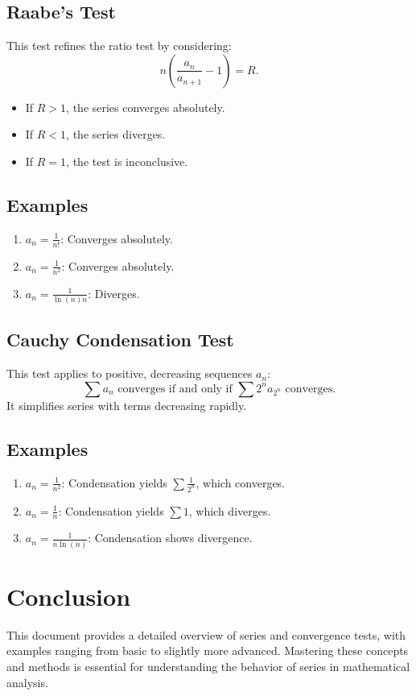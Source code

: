 \documentclass[a4paper, 12pt]{article}
\begin{document}
\subsection{Raabe's Test}
This test refines the ratio test by considering:
\[n \left(\frac{a_n}{a_{n+1}} - 1\right) = R.\]
\begin{itemize}
    \item If \(R > 1\), the series converges absolutely.
    \item If \(R < 1\), the series diverges.
    \item If \(R = 1\), the test is inconclusive.
\end{itemize}

\subsection*{Examples}
\begin{enumerate}
    \item \(a_n = \frac{1}{n!}\): Converges absolutely.
    \item \(a_n = \frac{1}{n^2}\): Converges absolutely.
    \item \(a_n = \frac{1}{\ln(n) n}\): Diverges.
\end{enumerate}

\subsection{Cauchy Condensation Test}
This test applies to positive, decreasing sequences \(a_n\):
\[\sum a_n \text{ converges if and only if } \sum 2^n a_{2^n} \text{ converges.}\]
It simplifies series with terms decreasing rapidly.

\subsection*{Examples}
\begin{enumerate}
    \item \(a_n = \frac{1}{n^2}\): Condensation yields \(\sum \frac{1}{2^n}\), which converges.
    \item \(a_n = \frac{1}{n}\): Condensation yields \(\sum 1\), which diverges.
    \item \(a_n = \frac{1}{n \ln(n)}\): Condensation shows divergence.
\end{enumerate}

\section{Conclusion}
This document provides a detailed overview of series and convergence tests, with examples ranging from basic to slightly more advanced. Mastering these concepts and methods is essential for understanding the behavior of series in mathematical analysis.
\end{document}
